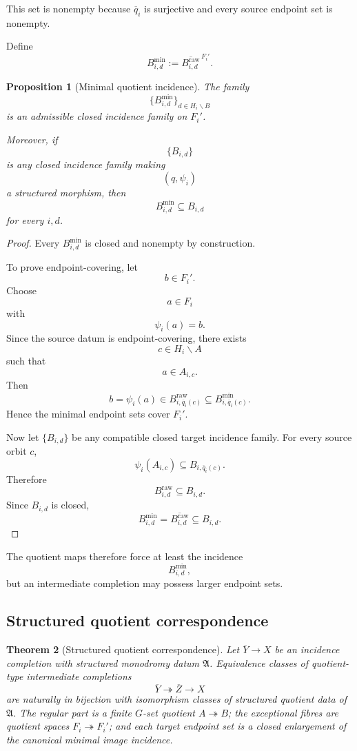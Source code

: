 \documentclass[11pt]{article}
\theoremstyle{plain}
\newtheorem{theorem}{Theorem}[section]
\newtheorem{proposition}[theorem]{Proposition}
\theoremstyle{definition}
\begin{document}
This set is nonempty because $\overline q_i$ is surjective and every
source endpoint set is nonempty.

Define
\[
B_{i,d}^{\min}
:=
\overline{
B_{i,d}^{\mathrm{raw}}
}^{\,F_i'}.
\]

\begin{proposition}[Minimal quotient incidence]
\label{prop:minimal-quotient-incidence}
The family
\[
\{B_{i,d}^{\min}\}_{d\in H_i\backslash B}
\]
is an admissible closed incidence family on $F_i'$.

Moreover, if
\[
\{B_{i,d}\}
\]
is any closed incidence family making
\[
(q,\psi_i)
\]
a structured morphism, then
\[
B_{i,d}^{\min}
\subseteq
B_{i,d}
\]
for every $i,d$.
\end{proposition}

\begin{proof}
Every $B_{i,d}^{\min}$ is closed and nonempty by construction.

To prove endpoint-covering, let
\[
b\in F_i'.
\]
Choose
\[
a\in F_i
\]
with
\[
\psi_i(a)=b.
\]
Since the source datum is endpoint-covering, there exists
\[
c\in H_i\backslash A
\]
such that
\[
a\in A_{i,c}.
\]
Then
\[
b=\psi_i(a)
\in
B_{i,\overline q_i(c)}^{\mathrm{raw}}
\subseteq
B_{i,\overline q_i(c)}^{\min}.
\]
Hence the minimal endpoint sets cover $F_i'$.

Now let $\{B_{i,d}\}$ be any compatible closed target incidence family.
For every source orbit $c$,
\[
\psi_i(A_{i,c})
\subseteq
B_{i,\overline q_i(c)}.
\]
Therefore
\[
B_{i,d}^{\mathrm{raw}}
\subseteq
B_{i,d}.
\]
Since $B_{i,d}$ is closed,
\[
B_{i,d}^{\min}
=
\overline{B_{i,d}^{\mathrm{raw}}}
\subseteq
B_{i,d}.
\]
\end{proof}

The quotient maps therefore force at least the incidence
\[
B_{i,d}^{\min},
\]
but an intermediate completion may possess larger endpoint sets.


\subsection{Structured quotient correspondence}
\label{subsec:structured-quotient-correspondence}

\begin{theorem}[Structured quotient correspondence]
\label{thm:structured-quotient-correspondence}
Let $\overline Y\to X$ be an incidence completion with structured monodromy datum
$\mathfrak A$.  Equivalence classes of quotient-type intermediate completions
\[
\overline Y\twoheadrightarrow\overline Z\longrightarrow X
\]
are naturally in bijection with isomorphism classes of structured quotient data of
$\mathfrak A$.  The regular part is a finite $G$-set quotient $A\twoheadrightarrow B$;
the exceptional fibres are quotient spaces $F_i\twoheadrightarrow F_i'$; and each target
endpoint set is a closed enlargement of the canonical minimal image incidence.
\end{theorem}
\end{document}
